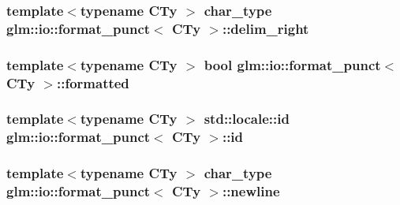 \subsubsection[{delim\+\_\+right}]{\setlength{\rightskip}{0pt plus 5cm}template$<$typename C\+Ty $>$ char\+\_\+type {\bf glm\+::io\+::format\+\_\+punct}$<$ C\+Ty $>$\+::delim\+\_\+right}\label{classglm_1_1io_1_1format__punct_a62fb1280404360463ec5af7144aa0949}
\hypertarget{classglm_1_1io_1_1format__punct_ab28088e6eef03fe4222fa8a5dd95288e}{}
\subsubsection[{formatted}]{\setlength{\rightskip}{0pt plus 5cm}template$<$typename C\+Ty $>$ bool {\bf glm\+::io\+::format\+\_\+punct}$<$ C\+Ty $>$\+::formatted}\label{classglm_1_1io_1_1format__punct_ab28088e6eef03fe4222fa8a5dd95288e}
\hypertarget{classglm_1_1io_1_1format__punct_a763f60aeaecec9290917ed1d83b79838}{}
\subsubsection[{id}]{\setlength{\rightskip}{0pt plus 5cm}template$<$typename C\+Ty $>$ std\+::locale\+::id {\bf glm\+::io\+::format\+\_\+punct}$<$ C\+Ty $>$\+::id\hspace{0.3cm}{\ttfamily [static]}}\label{classglm_1_1io_1_1format__punct_a763f60aeaecec9290917ed1d83b79838}
\hypertarget{classglm_1_1io_1_1format__punct_a8ddf8abdb0ebbdbb7eca08d7a777956e}{}
\subsubsection[{newline}]{\setlength{\rightskip}{0pt plus 5cm}template$<$typename C\+Ty $>$ char\+\_\+type {\bf glm\+::io\+::format\+\_\+punct}$<$ C\+Ty $>$\+::newline}\label{classglm_1_1io_1_1format__punct_a8ddf8abdb0ebbdbb7eca08d7a777956e}
\hypertarget{classglm_1_1io_1_1format__punct_a9de1f3b7120a036ec0ab394d2036d0aa}{}
